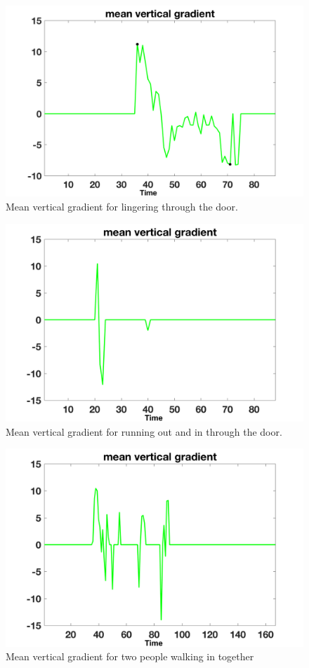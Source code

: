 \documentclass[12pt,oneside]{article} %
\begin{document}
\begin{figure}[!htb]
\centering
\includegraphics[scale=0.52]{images/lingerThrough.png}
\caption{Mean vertical gradient for lingering through the door.}
\label{linger}
\end{figure}

\begin{figure}[!htb]
\centering
\includegraphics[scale=0.52]{images/runoutandin.png}
\caption{Mean vertical gradient for running out and in through the door.}
\label{run}
\end{figure}

\begin{figure}[!htb]
\centering
\includegraphics[scale=0.52]{images/quickoutandin.png}
\caption{Mean vertical gradient for two people walking in together}
\label{together}
\end{figure}
\end{document}
